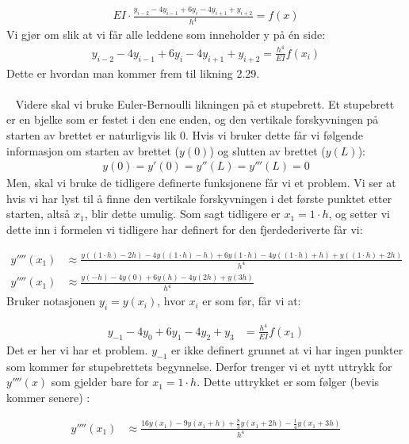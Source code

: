 \begin{align}
EI\cdot	\frac{y_{i-2}-4y_{i-1}+6y_i-4y_{i+1}+y_{i+2}}{h^4}=f(x)
\end{align}
Vi gjør om slik at vi får alle leddene som inneholder y på én side:
\begin{align}
    y_{i-2}-4y_{i-1}+6y_i-4y_{i+1}+y_{i+2}=\frac{h^4}{EI}f(x_i)
\end{align}
Dette er hvordan man kommer frem til likning 2.29. 
\\ \\ 
Videre skal vi bruke Euler-Bernoulli likningen på et stupebrett. Et stupebrett er en bjelke som er festet i den ene enden, og den vertikale forskyvningen på starten av brettet er naturligvis lik 0. Hvis vi bruker dette får vi følgende informasjon om starten av brettet ($y(0)$) og slutten av brettet ($y(L)$):
\begin{align}
    y(0)=y'(0)=y''(L)=y'''(L)=0
\end{align}
Men, skal vi bruke de tidligere definerte funksjonene får vi et problem. Vi ser at hvis vi har lyst til å finne den vertikale forskyvningen i det første punktet etter starten, altså $x_1$, blir dette umulig. Som sagt tidligere er $x_1=1\cdot h$, og setter vi dette inn i formelen vi tidligere har definert for den fjerdederiverte får vi: 

\begin{align}
	y''''(x_1)&\approx \frac{y((1\cdot h)-2h)-4y((1\cdot h)-h)+6y(1\cdot h)-4y((1\cdot h)+h)+y((1\cdot h)+2h)}{h^4}\nonumber \\
	y''''(x_1)&\approx \frac{y(-h)-4y(0)+6y(h)-4y(2h)+y(3h)}{h^4}
\end{align}
Bruker notasjonen $y_i=y(x_i)$, hvor $x_i$ er som før, får vi at: 

\begin{align}
    y_{-1}-4y_0+6y_1-4y_2+y_3&=\frac{h^4}{EI}f(x_1)
\end{align}
Det er her vi har et problem. $y_{-1}$ er ikke definert grunnet at vi har ingen punkter som kommer før stupebrettets begynnelse. Derfor trenger vi et nytt uttrykk for $y''''(x)$ som gjelder bare for $x_1=1 \cdot h$. Dette uttrykket er som følger (bevis kommer senere) : 

\begin{align}
    y''''(x_1) &\approx \frac{16y(x_1)-9y(x_1+h)+\frac{8}{3}y(x_1+2h)-\frac{1}{4}y(x_1+3h)}{h^4}
\end{align}

